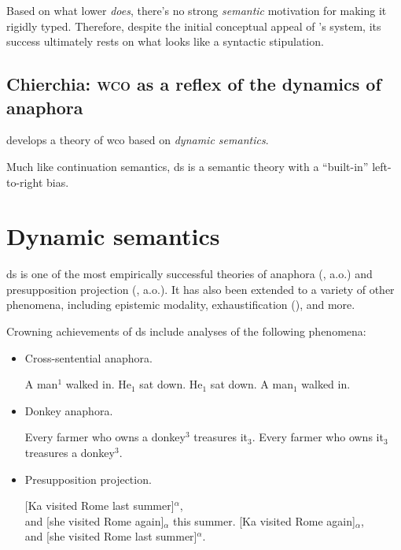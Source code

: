 \documentclass[nols,twoside,nofonts,nobib,nohyper]{tufte-handout}
\begin{document}
Based on what lower \textit{does}, there's no strong \textit{semantic}
motivation for making it rigidly typed. Therefore, despite the initial
conceptual appeal of \citeauthor{barkerShan2015}'s system, its success
ultimately rests on what looks like a syntactic stipulation.

\subsection{Chierchia: \textsc{wco} as a reflex of the dynamics of anaphora}

\citet{chierchia2020} develops a theory of \ac{wco} based on \textit{dynamic
  semantics}.

Much like continuation semantics, \ac{ds} is a semantic theory with a
\enquote{built-in} left-to-right bias.

\section{Dynamic semantics}


\ac{ds} is one of the most empirically successful theories of anaphora
(\citealt{heim1982,groenendijk_dynamic_1991,dekker1994}, a.o.) and
presupposition projection (\citealt{heim1983,beaver_presupposition_2001}, a.o.).
It has also been extended to a variety of other phenomena, including epistemic
modality, exhaustification (\citealt{elliott-twosouls}),
and more.

Crowning achievements of \ac{ds} include analyses of the following
phenomena:

\begin{itemize}

    \item Cross-sentential anaphora.

    \pex
    \a A man$^{1}$ walked in. He$_{1}$ sat down.
    \a\ljudge{*}He$_{1}$ sat down. A man$_{1}$ walked in.
    \xe

    \item Donkey anaphora.

    \pex
    \a Every farmer who owns a donkey$^{3}$ treasures it$_{3}$.
    \a{}Every farmer who owns it$_{3}$ treasures a donkey$^{3}$.
    \xe

  \item Presupposition projection.

    \pex
    \a{}[Ka visited Rome last summer]$^{α}$,\\
    and [she visited Rome again]$_{α}$
    this summer.
    \a\ljudge{\#}{}[Ka visited Rome again]$_{α}$,\\
    and [she visited Rome last summer]$^{α}$.
    \xe

\end{itemize}
\end{document}
